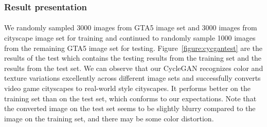 \subsubsection{Result presentation}
\paragraph{}
We randomly sampled 3000 images from GTA5 image set and 3000 images from cityscape image set for training and continued to randomly sample 1000 images from the remaining GTA5 image set for testing. Figure~\ref{figure:cycgantest} are the results of the test which contains the testing results from the training set and the results from the test set. We can observe that our CycleGAN recognizes color and texture variations excellently across different image sets and successfully converts video game cityscapes to real-world style cityscapes. It performs better on the training set than on the test set, which conforms to our expectations. Note that the converted image on the test set seems to be slightly blurry compared to the image on the training set, and there may be some color distortion.

